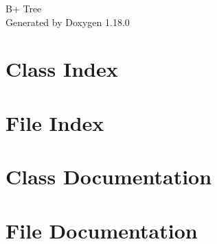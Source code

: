 \documentclass[twoside]{book}
\newcommand{\+}{\discretionary{\mbox{\scriptsize$\hookleftarrow$}}{}{}}
\newcommand{\clearemptydoublepage}{%
    \newpage{\pagestyle{empty}\cleardoublepage}%
  }
\begin{document}
  \raggedbottom
    \hypersetup{pageanchor=false,
                bookmarksnumbered=true,
                pdfencoding=unicode
               }
  \begin{titlepage}
  \vspace*{7cm}
  \begin{center}%
  {\Large B+ Tree}\\
  \vspace*{1cm}
  {\large Generated by Doxygen 1.18.0}\\
  \end{center}
  \end{titlepage}
  \clearemptydoublepage
  \tableofcontents
  \clearemptydoublepage
  \hypersetup{pageanchor=true}
\chapter{Class Index}

\chapter{File Index}

\chapter{Class Documentation}


\chapter{File Documentation}


  \backmatter
  \newpage
  \clearemptydoublepage
  \printindex
\end{document}
